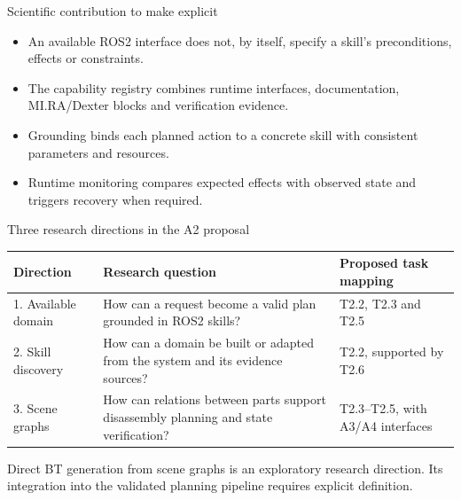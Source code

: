 \documentclass[aspectratio=169,10pt]{beamer}
\begin{document}
\begin{frame}{Scientific contribution to make explicit}
\begin{itemize}\items
\item An available ROS2 interface does not, by itself, specify a skill's preconditions, effects or constraints.
\item The capability registry combines runtime interfaces, documentation, MI.RA/Dexter blocks and verification evidence.
\item Grounding binds each planned action to a concrete skill with consistent parameters and resources.
\item Runtime monitoring compares expected effects with observed state and triggers recovery when required.
\end{itemize}
\end{frame}

\begin{frame}{Three research directions in the A2 proposal}
\small\renewcommand{\arraystretch}{1.35}
\begin{tabularx}{\textwidth}{@{}p{}XX@{}}
\toprule
Direction & Research question & Proposed task mapping\\\midrule
1. Available domain & How can a request become a valid plan grounded in ROS2 skills? & T2.2, T2.3 and T2.5\\
2. Skill discovery & How can a domain be built or adapted from the system and its evidence sources? & T2.2, supported by T2.6\\
3. Scene graphs & How can relations between parts support disassembly planning and state verification? & T2.3--T2.5, with A3/A4 interfaces\\\bottomrule
\end{tabularx}
\par\vspace{3mm}
Direct BT generation from scene graphs is an exploratory research direction. Its integration into the validated planning pipeline requires explicit definition.
\end{frame}
\end{document}
